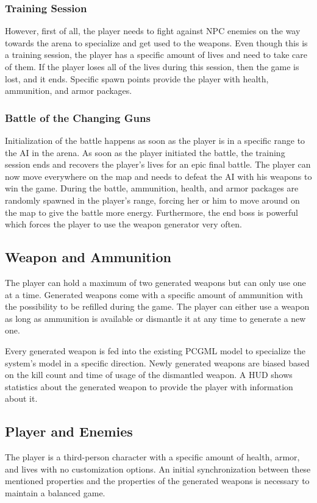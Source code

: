 \documentclass[MGS,Master,english]{twbook}%
\begin{document}
\subsubsection{Training Session}
However, first of all, the player needs to fight against \ac{NPC} enemies on the way towards the arena to specialize and get used to the weapons. Even though this is a training session, the player has a specific amount of lives and need to take care of them. If the player loses all of the lives during this session, then the game is lost, and it ends. Specific spawn points provide the player with health, ammunition, and armor packages.

\subsubsection{Battle of the Changing Guns}
Initialization of the battle happens as soon as the player is in a specific range to the \ac{AI} in the arena. As soon as the player initiated the battle, the training session ends and recovers the player's lives for an epic final battle. The player can now move everywhere on the map and needs to defeat the \ac{AI} with his weapons to win the game. During the battle, ammunition, health, and armor packages are randomly spawned in the player's range, forcing her or him to move around on the map to give the battle more energy. Furthermore, the end boss is powerful which forces the player to use the weapon generator very often. 

\subsection{Weapon and Ammunition}
The player can hold a maximum of two generated weapons but can only use one at a time. Generated weapons come with a specific amount of ammunition with the possibility to be refilled during the game. The player can either use a weapon as long as ammunition is available or dismantle it at any time to generate a new one.

Every generated weapon is fed into the existing \ac{PCGML} model to specialize the system’s model in a specific direction. Newly generated weapons are biased based on the kill count and time of usage of the dismantled weapon. A \ac{HUD} shows statistics about the generated weapon to provide the player with information about it. 

\subsection{Player and Enemies}
The player is a third-person character with a specific amount of health, armor, and lives with no customization options. An initial synchronization between these mentioned properties and the properties of the generated weapons is necessary to maintain a balanced game.
\end{document}
